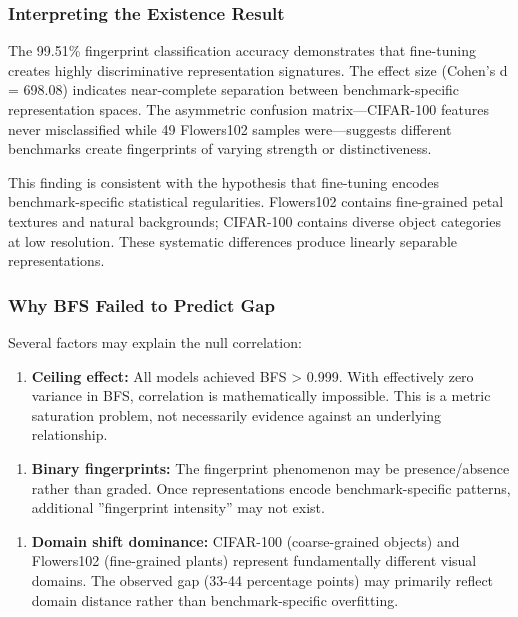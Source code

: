 
\subsubsection{Interpreting the Existence Result}

The 99.51\% fingerprint classification accuracy demonstrates that fine-tuning creates highly discriminative representation signatures. The effect size (Cohen's d = 698.08) indicates near-complete separation between benchmark-specific representation spaces. The asymmetric confusion matrix---CIFAR-100 features never misclassified while 49 Flowers102 samples were---suggests different benchmarks create fingerprints of varying strength or distinctiveness.

This finding is consistent with the hypothesis that fine-tuning encodes benchmark-specific statistical regularities. Flowers102 contains fine-grained petal textures and natural backgrounds; CIFAR-100 contains diverse object categories at low resolution. These systematic differences produce linearly separable representations.

\subsubsection{Why BFS Failed to Predict Gap}

Several factors may explain the null correlation:

\begin{enumerate}
\item \textbf{Ceiling effect:} All models achieved BFS > 0.999. With effectively zero variance in BFS, correlation is mathematically impossible. This is a metric saturation problem, not necessarily evidence against an underlying relationship.
\end{enumerate}

\begin{enumerate}
\item \textbf{Binary fingerprints:} The fingerprint phenomenon may be presence/absence rather than graded. Once representations encode benchmark-specific patterns, additional ''fingerprint intensity'' may not exist.
\end{enumerate}

\begin{enumerate}
\item \textbf{Domain shift dominance:} CIFAR-100 (coarse-grained objects) and Flowers102 (fine-grained plants) represent fundamentally different visual domains. The observed gap (33-44 percentage points) may primarily reflect domain distance rather than benchmark-specific overfitting.
\end{enumerate}

